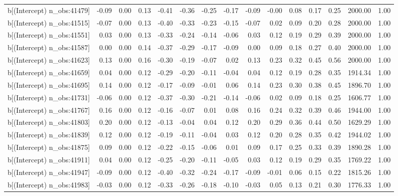\begin{table}[ht]
\begin{tabular}{rrrrrrrrrrrrrrr}
  b[(Intercept) n\_obs:41479] & -0.09 & 0.00 & 0.13 & -0.41 & -0.36 & -0.25 & -0.17 & -0.09 & -0.00 & 0.08 & 0.17 & 0.25 & 2000.00 & 1.00 \\ 
  b[(Intercept) n\_obs:41515] & -0.07 & 0.00 & 0.13 & -0.40 & -0.33 & -0.23 & -0.15 & -0.07 & 0.02 & 0.09 & 0.20 & 0.28 & 2000.00 & 1.00 \\ 
  b[(Intercept) n\_obs:41551] & 0.03 & 0.00 & 0.13 & -0.33 & -0.24 & -0.14 & -0.06 & 0.03 & 0.12 & 0.19 & 0.29 & 0.39 & 2000.00 & 1.00 \\ 
  b[(Intercept) n\_obs:41587] & 0.00 & 0.00 & 0.14 & -0.37 & -0.29 & -0.17 & -0.09 & 0.00 & 0.09 & 0.18 & 0.27 & 0.40 & 2000.00 & 1.00 \\ 
  b[(Intercept) n\_obs:41623] & 0.13 & 0.00 & 0.16 & -0.30 & -0.19 & -0.07 & 0.02 & 0.13 & 0.23 & 0.32 & 0.45 & 0.56 & 2000.00 & 1.00 \\ 
  b[(Intercept) n\_obs:41659] & 0.04 & 0.00 & 0.12 & -0.29 & -0.20 & -0.11 & -0.04 & 0.04 & 0.12 & 0.19 & 0.28 & 0.35 & 1914.34 & 1.00 \\ 
  b[(Intercept) n\_obs:41695] & 0.14 & 0.00 & 0.12 & -0.17 & -0.09 & -0.01 & 0.06 & 0.14 & 0.23 & 0.30 & 0.38 & 0.45 & 1896.70 & 1.00 \\ 
  b[(Intercept) n\_obs:41731] & -0.06 & 0.00 & 0.12 & -0.37 & -0.30 & -0.21 & -0.14 & -0.06 & 0.02 & 0.09 & 0.18 & 0.25 & 1606.77 & 1.00 \\ 
  b[(Intercept) n\_obs:41767] & 0.16 & 0.00 & 0.12 & -0.16 & -0.07 & 0.01 & 0.08 & 0.16 & 0.24 & 0.32 & 0.39 & 0.46 & 1944.00 & 1.00 \\ 
  b[(Intercept) n\_obs:41803] & 0.20 & 0.00 & 0.12 & -0.13 & -0.04 & 0.04 & 0.12 & 0.20 & 0.29 & 0.36 & 0.44 & 0.50 & 1629.29 & 1.00 \\ 
  b[(Intercept) n\_obs:41839] & 0.12 & 0.00 & 0.12 & -0.19 & -0.11 & -0.04 & 0.03 & 0.12 & 0.20 & 0.28 & 0.35 & 0.42 & 1944.02 & 1.00 \\ 
  b[(Intercept) n\_obs:41875] & 0.09 & 0.00 & 0.12 & -0.22 & -0.15 & -0.06 & 0.01 & 0.09 & 0.17 & 0.25 & 0.33 & 0.39 & 1890.28 & 1.00 \\ 
  b[(Intercept) n\_obs:41911] & 0.04 & 0.00 & 0.12 & -0.25 & -0.20 & -0.11 & -0.05 & 0.03 & 0.12 & 0.19 & 0.29 & 0.35 & 1769.22 & 1.00 \\ 
  b[(Intercept) n\_obs:41947] & -0.09 & 0.00 & 0.12 & -0.40 & -0.32 & -0.24 & -0.17 & -0.09 & -0.01 & 0.06 & 0.15 & 0.22 & 1815.26 & 1.00 \\ 
  b[(Intercept) n\_obs:41983] & -0.03 & 0.00 & 0.12 & -0.33 & -0.26 & -0.18 & -0.10 & -0.03 & 0.05 & 0.13 & 0.21 & 0.30 & 1776.33 & 1.00 \\ 

\end{tabular}
\end{table}
